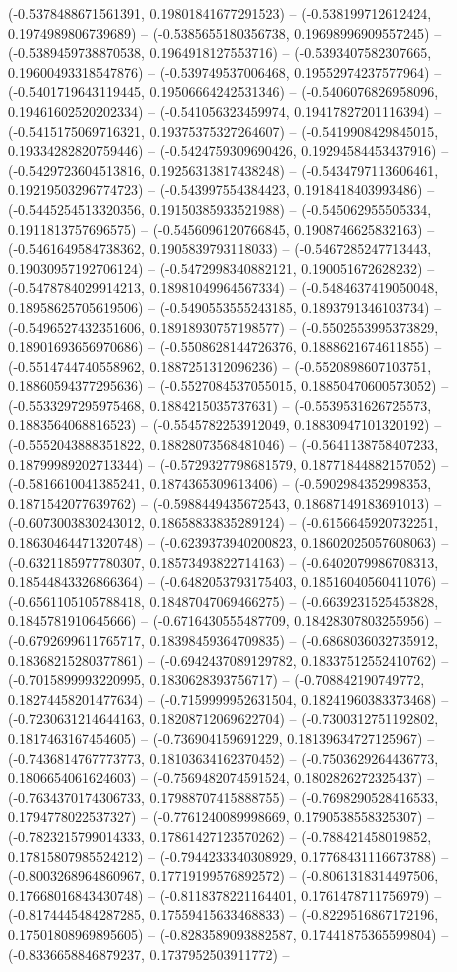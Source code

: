 (-0.5378488671561391, 0.19801841677291523) -- (-0.538199712612424, 0.1974989806739689) -- (-0.5385655180356738, 0.19698996909557245) -- (-0.5389459738870538, 0.1964918127553716) -- (-0.5393407582307665, 0.19600493318547876) -- (-0.539749537006468, 0.19552974237577964) -- (-0.5401719643119445, 0.19506664242531346) -- (-0.5406076826958096, 0.19461602520202334) -- (-0.541056323459974, 0.19417827201116394) -- (-0.5415175069716321, 0.19375375327264607) -- (-0.5419908429845015, 0.19334282820759446) -- (-0.5424759309690426, 0.19294584453437916) -- (-0.5429723604513816, 0.19256313817438248) -- (-0.5434797113606461, 0.19219503296774723) -- (-0.543997554384423, 0.1918418403993486) -- (-0.5445254513320356, 0.19150385933521988) -- (-0.545062955505334, 0.1911813757696575) -- (-0.5456096120766845, 0.1908746625832163) -- (-0.5461649584738362, 0.1905839793118033) -- (-0.5467285247713443, 0.19030957192706124) -- (-0.5472998340882121, 0.190051672628232) -- (-0.5478784029914213, 0.18981049964567334) -- (-0.5484637419050048, 0.18958625705619506) -- (-0.5490553555243185, 0.1893791346103734) -- (-0.5496527432351606, 0.18918930757198577) -- (-0.5502553995373829, 0.18901693656970686) -- (-0.5508628144726376, 0.1888621674611855) -- (-0.5514744740558962, 0.1887251312096236) -- (-0.5520898607103751, 0.18860594377295636) -- (-0.5527084537055015, 0.18850470600573052) -- (-0.5533297295975468, 0.1884215035737631) -- (-0.5539531626725573, 0.1883564068816523) -- (-0.5545782253912049, 0.18830947101320192) -- (-0.5552043888351822, 0.18828073568481046) -- (-0.5641138758407233, 0.18799989202713344) -- (-0.5729327798681579, 0.18771844882157052) -- (-0.5816610041385241, 0.1874365309613406) -- (-0.5902984352998353, 0.1871542077639762) -- (-0.5988449435672543, 0.18687149183691013) -- (-0.6073003830243012, 0.18658833835289124) -- (-0.6156645920732251, 0.18630464471320748) -- (-0.6239373940200823, 0.18602025057608063) -- (-0.6321185977780307, 0.18573493822714163) -- (-0.6402079986708313, 0.18544843326866364) -- (-0.6482053793175403, 0.18516040560411076) -- (-0.6561105105788418, 0.18487047069466275) -- (-0.6639231525453828, 0.1845781910645666) -- (-0.6716430555487709, 0.18428307803255956) -- (-0.6792699611765717, 0.18398459364709835) -- (-0.6868036032735912, 0.18368215280377861) -- (-0.6942437089129782, 0.18337512552410762) -- (-0.7015899993220995, 0.1830628393756717) -- (-0.708842190749772, 0.18274458201477634) -- (-0.7159999952631504, 0.18241960383373468) -- (-0.7230631214644163, 0.18208712069622704) -- (-0.7300312751192802, 0.1817463167454605) -- (-0.736904159691229, 0.18139634727125967) -- (-0.7436814767773773, 0.18103634162370452) -- (-0.7503629264436773, 0.1806654061624603) -- (-0.7569482074591524, 0.1802826272325437) -- (-0.7634370174306733, 0.17988707415888755) -- (-0.7698290528416533, 0.1794778022537327) -- (-0.7761240089998669, 0.1790538558325307) -- (-0.7823215799014333, 0.17861427123570262) -- (-0.788421458019852, 0.17815807985524212) -- (-0.7944233340308929, 0.17768431116673788) -- (-0.8003268964860967, 0.17719199576892572) -- (-0.8061318314497506, 0.17668016843430748) -- (-0.8118378221164401, 0.1761478711756979) -- (-0.8174445484287285, 0.17559415633468833) -- (-0.8229516867172196, 0.17501808969895605) -- (-0.8283589093882587, 0.17441875365599804) -- (-0.8336658846879237, 0.1737952503911772) -- 